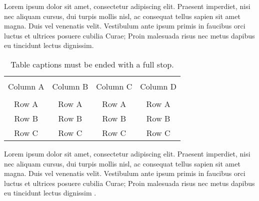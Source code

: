Lorem ipsum dolor sit amet, consectetur adipiscing elit. Praesent imperdiet, nisi nec aliquam cursus, dui turpis mollis nisl, ac consequat tellus sapien sit amet magna. Duis vel venenatis velit. Vestibulum ante ipsum primis in faucibus orci luctus et ultrices posuere cubilia Curae; Proin malesuada risus nec metus dapibus eu tincidunt lectus dignissim.

\begin{table*}[htp!]
	{\setlength{\tabcolsep}{14pt}
		\caption{Table captions must be ended with a full stop.}
		\begin{center}
			\vspace{-6mm}
			\begin{tabular}{cccc}
				\hline \\[-2.45ex] \hline \\[-2.1ex]
				Column A & Column B & Column C & Column D \\
				\hline \\[-1.8ex]
				Row A & Row A & Row A & Row A \\
				Row B & Row B & Row B & Row B \\
				Row C & Row C & Row C & Row C \\
				\hline
			\end{tabular}
			\vspace{-6mm}
		\end{center}
		\label{Table1.1}}
\end{table*}

Lorem ipsum dolor sit amet, consectetur adipiscing elit. Praesent imperdiet, nisi nec aliquam cursus, dui turpis mollis nisl, ac consequat tellus sapien sit amet magna. Duis vel venenatis velit. Vestibulum ante ipsum primis in faucibus orci luctus et ultrices posuere cubilia Curae; Proin malesuada risus nec metus dapibus eu tincidunt lectus dignissim \cite{1993JHyd..144..193B}.